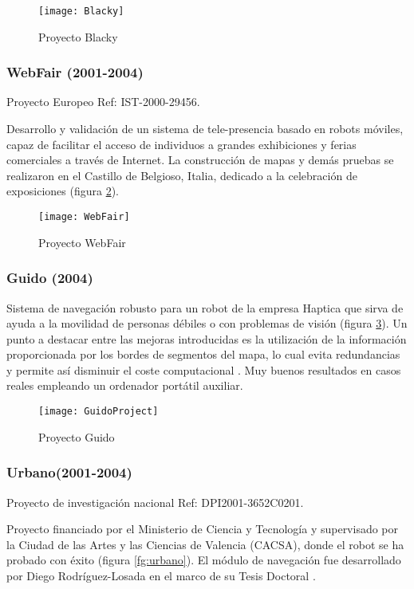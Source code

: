\begin{figure}[hbt]
  \centering\texttt{[image: Blacky]}\\
  \caption{Proyecto Blacky}\label{fg:blacky}
\end{figure}


\subsubsection{WebFair (2001-2004)}
Proyecto Europeo Ref: IST-2000-29456.

Desarrollo y validación de un sistema de tele-presencia basado en robots móviles, capaz de facilitar el acceso de individuos a grandes exhibiciones y ferias comerciales a través de Internet. La construcción de mapas y demás pruebas se realizaron en el Castillo de Belgioso, Italia, dedicado a la celebración de exposiciones (figura \ref{fg:WebFair}).

\begin{figure}[bt]
  \centering\texttt{[image: WebFair]}\\
  \caption{Proyecto WebFair}\label{fg:WebFair}
\end{figure}

\subsubsection{Guido (2004)}
Sistema de navegación robusto para un robot de la empresa Haptica que sirva de ayuda a la movilidad de personas débiles o con problemas de visión (figura \ref{fg:guido}). Un punto a destacar entre las mejoras introducidas es la utilización de la información proporcionada por los bordes de segmentos del mapa, lo cual evita redundancias y permite así disminuir el coste computacional \cite{RodriguezLosada05}. Muy buenos resultados en casos reales empleando un ordenador portátil auxiliar.

\begin{figure}[hbt]
  \centering\texttt{[image: GuidoProject]}\\
  \caption{Proyecto Guido}\label{fg:guido}
\end{figure}

\subsubsection{Urbano(2001-2004)}\label{UrbanoProject}
Proyecto de investigación nacional Ref: DPI2001-3652C0201.

Proyecto financiado por el Ministerio de Ciencia y Tecnología y supervisado por la Ciudad de las Artes y las Ciencias de Valencia (CACSA), donde el robot se ha probado con éxito (figura \ref{fg:urbano}). El módulo de navegación fue desarrollado por Diego Rodríguez-Losada en el marco de su Tesis Doctoral \cite{Rodriguez-Losada04}.

